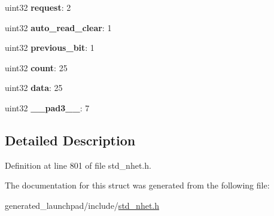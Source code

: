 \begin{DoxyCompactItemize}
\item 
\mbox{\label{structapcnt__format_a0aef4b42caccecc074f2ec52854200b7}} 
uint32 {\bfseries request}\+: 2
\item 
\mbox{\label{structapcnt__format_a1a35bf4dbb2e3d1b1544afd447e29320}} 
uint32 {\bfseries auto\+\_\+read\+\_\+clear}\+: 1
\item 
\mbox{\label{structapcnt__format_afd64f21deb21d6ae12a8586082556c1d}} 
uint32 {\bfseries previous\+\_\+bit}\+: 1
\item 
\mbox{\label{structapcnt__format_af7cbf719321fa1ded691d89dbedc426c}} 
uint32 {\bfseries count}\+: 25
\item 
\mbox{\label{structapcnt__format_a3952d227d4ba00152b094ef2431c9541}} 
uint32 {\bfseries data}\+: 25
\item 
\mbox{\label{structapcnt__format_a23e64e9d683f24444ac45e57c1060b7e}} 
uint32 {\bfseries \+\_\+\+\_\+pad3\+\_\+\+\_\+}\+: 7
\end{DoxyCompactItemize}


\subsection{Detailed Description}


Definition at line 801 of file std\+\_\+nhet.\+h.



The documentation for this struct was generated from the following file\+:\begin{DoxyCompactItemize}
\item 
generated\+\_\+launchpad/include/\mbox{\hyperlink{std__nhet_8h}{std\+\_\+nhet.\+h}}\end{DoxyCompactItemize}
